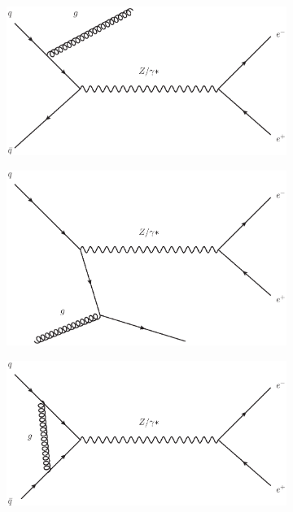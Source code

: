 \begin{figure}[!p]
    \centering
    \begin{subfigure}[b]{\SideBySidePlotWidth}
        \includegraphics[width=\linewidth]{figures/DYISR.eps}
        \caption{}
        \label{fig:feyn_DYISR}
    \end{subfigure}%
    \begin{subfigure}[b]{\SideBySidePlotWidth}
        \includegraphics[width=\linewidth]{figures/DYQuarkRadiation.eps}
        \caption{}
        \label{fig:feyn_DYQuarkRadiation}
    \end{subfigure}%
    \hfill
    \begin{subfigure}[b]{\SideBySidePlotWidth}
        \includegraphics[width=\linewidth]{figures/DYloops.eps}

\end{subfigure}
\end{figure}
